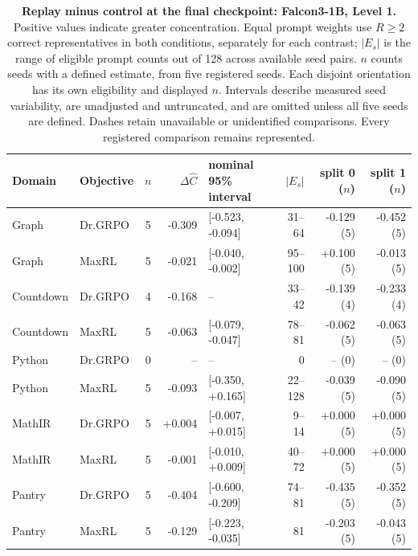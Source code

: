 \begin{table}[!htbp]
\centering
\scriptsize
\setlength{\tabcolsep}{3pt}
\begin{tabular}{@{}llcrlrrr@{}}
\toprule
Domain & Objective & $n$ & $\Delta\widehat C$ & nominal 95\% interval & $|E_s|$ & split 0 ($n$) & split 1 ($n$) \\
\midrule
Graph & Dr.GRPO & 5 & -0.309 & [-0.523, -0.094] & 31--64 & -0.129 (5) & -0.452 (5) \\
Graph & MaxRL & 5 & -0.021 & [-0.040, -0.002] & 95--100 & +0.100 (5) & -0.013 (5) \\
Countdown & Dr.GRPO & 4 & -0.168 & -- & 33--42 & -0.139 (4) & -0.233 (4) \\
Countdown & MaxRL & 5 & -0.063 & [-0.079, -0.047] & 78--81 & -0.062 (5) & -0.063 (5) \\
Python & Dr.GRPO & 0 & -- & -- & 0 & -- (0) & -- (0) \\
Python & MaxRL & 5 & -0.093 & [-0.350, +0.165] & 22--128 & -0.039 (5) & -0.090 (5) \\
MathIR & Dr.GRPO & 5 & +0.004 & [-0.007, +0.015] & 9--14 & +0.000 (5) & +0.000 (5) \\
MathIR & MaxRL & 5 & -0.001 & [-0.010, +0.009] & 40--72 & +0.000 (5) & +0.000 (5) \\
Pantry & Dr.GRPO & 5 & -0.404 & [-0.600, -0.209] & 74--81 & -0.435 (5) & -0.352 (5) \\
Pantry & MaxRL & 5 & -0.129 & [-0.223, -0.035] & 81 & -0.203 (5) & -0.043 (5) \\
\bottomrule
\end{tabular}
\caption{\textbf{Replay minus control at the final checkpoint: Falcon3-1B, Level 1.} Positive values indicate greater concentration. Equal prompt weights use $R\ge2$ correct representatives in both conditions, separately for each contrast; $|E_s|$ is the range of eligible prompt counts out of 128 across available seed pairs. $n$ counts seeds with a defined estimate, from five registered seeds. Each disjoint orientation has its own eligibility and displayed $n$. Intervals describe measured seed variability, are unadjusted and untruncated, and are omitted unless all five seeds are defined. Dashes retain unavailable or unidentified comparisons. Every registered comparison remains represented.}
\end{table}

